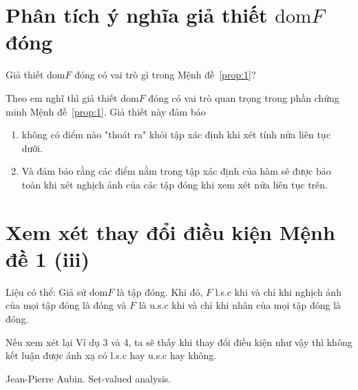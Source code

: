 \documentclass{article}
\begin{document}
\section{Phân tích ý nghĩa giả thiết $\text{dom}F$ đóng}

\begin{question}
    Giả thiết $\text{dom}F$ đóng có vai trò gì trong Mệnh đề~\ref{prop:1}?
\end{question}

\begin{remark}
    Theo em nghĩ thì giả thiết $\text{dom}F$ đóng có vai trò quan trọng trong phần chứng minh Mệnh đề~\ref{prop:1}. Giả thiết này đảm bảo 
    \begin{enumerate}
        \item không có điểm nào "thoát ra" khỏi tập xác định khi xét tính nửa liên tục dưới.
        \item Và đảm bảo rằng các điểm nằm trong tập xác định của hàm sẽ được bảo toàn khi xét nghịch ảnh của các tập đóng khi xem xét nửa liên tục trên.
    \end{enumerate}
\end{remark}

\section{Xem xét thay đổi điều kiện Mệnh đề 1 (iii)}

\begin{question}
    Liệu có thể: Giả sử $\text{dom}F$ là tập đóng. Khi đó, $F$ l.s.c khi và chỉ khi nghịch ảnh của mọi tập đóng là đóng và $F$ là u.s.c khi và chỉ khi nhân của mọi tập đóng là đóng.
\end{question}

\begin{remark}
    Nếu xem xét lại Ví dụ 3 và 4, ta sẽ thấy khi thay đổi điều kiện như vậy thì không kết luận được ánh xạ có l.s.c hay u.s.c hay không. 
\end{remark}


  


\begin{thebibliography}{1}

Jean-Pierre Aubin.
\newblock Set-valued analysis.
\end{thebibliography}
\end{document}

